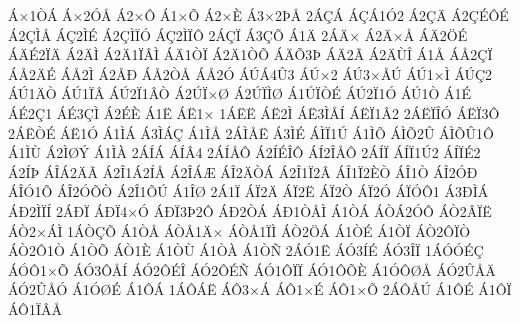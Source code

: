 {^^c1^^d71^^d2^^c1
^^c1^^d72^^d3^^c5
^^c12^^d7^^d4
^^c11^^d7^^d5
^^c12^^d7^^c8
^^c13^^d72^^de^^c5
2^^c1^^c7^^c1
^^c1^^c7^^c11^^d32
^^c12^^c7^^c4
^^c12^^c7^^c9^^d4^^c9
^^c12^^c7^^cc^^c5
^^c1^^c72^^cc^^c9
^^c12^^c7^^cc^^cf^^d3
^^c1^^c72^^cc^^cf^^d4
2^^c1^^c7^^cf
^^c13^^c7^^d5
^^c11^^c4
2^^c1^^c4^^d7
^^c12^^c4^^d7^^c5
^^c1^^c42^^d6^^c9
^^c1^^c4^^c92^^cf^^c4
^^c12^^c4^^cc
^^c12^^c41^^cf^^c2^^cc
^^c1^^c41^^d2^^cf
^^c12^^c41^^d2^^d5
^^c1^^c4^^d53^^de
^^c1^^c42^^c3
^^c12^^c4^^d9^^ce
^^c11^^c5
^^c1^^c52^^c7^^cf
^^c1^^c52^^c4^^c9
^^c1^^c52^^cc
^^c12^^c5^^d0
^^c1^^c52^^d2^^c5
^^c1^^c52^^d3
^^c1^^da^^c14^^db3
^^c1^^da^^d72
^^c1^^da3^^d7^^c5^^da
^^c1^^da1^^d7^^cc
^^c1^^da^^c72
^^c1^^da1^^c4^^d2
^^c1^^da1^^cf^^c2
^^c1^^da2^^cf1^^c2^^d2
^^c12^^da^^cf^^d7^^d8
^^c12^^da^^cf^^cc^^d8
^^c11^^da^^cf^^d2^^c9
^^c1^^da2^^cf1^^d3
^^c1^^da1^^d2
^^c11^^c9
^^c1^^c92^^c71
^^c1^^c93^^c7^^cc
^^c12^^c9^^c8
^^c11^^cb
^^c1^^cb1^^d7
1^^c1^^cb^^cb
^^c1^^cb2^^cc
^^c1^^cb3^^cc^^c5^^cd
^^c1^^cb^^cf1^^c22
2^^c1^^cb^^cf^^ce^^d3
^^c1^^cb^^cf3^^d4
2^^c1^^cb^^d2^^c9
^^c1^^cb1^^d3
^^c11^^cc^^c1
^^c13^^cc^^c1^^c7
^^c11^^cc^^c5
2^^c1^^cc^^c5^^cb
^^c13^^cc^^c9
^^c1^^cc^^cf1^^da
^^c11^^cc^^d5
^^c1^^cc^^d52^^db
^^c1^^cc^^d5^^db1^^d4
^^c11^^cc^^d9
^^c12^^cc^^d8^^dd
^^c11^^cc^^c0
2^^c1^^cd^^c1
^^c1^^cd^^c24
2^^c1^^cd^^c5^^d4
^^c12^^cd^^c9^^ce^^d4
^^c1^^cd2^^ce^^c5^^d4
2^^c1^^cd^^cf
^^c1^^cd^^cf1^^da2
^^c1^^cd^^cf^^c92
^^c12^^cd^^de
^^c1^^ce^^c12^^c4^^c3
^^c12^^ce1^^c12^^cd^^c5
^^c12^^ce^^c1^^c6
^^c1^^ce2^^c4^^d2^^c1
^^c12^^ce1^^cf2^^c2
^^c1^^ce1^^cf2^^c8^^d2
^^c1^^ce1^^d2
^^c1^^ce2^^d3^^d0
^^c1^^ce^^d31^^d5
^^c1^^ce2^^d3^^d5^^d2
^^c12^^ce1^^d5^^da
^^c11^^ce^^d8
2^^c11^^cf
^^c1^^cf2^^c4
^^c1^^cf2^^cb
^^c1^^cf2^^d2
^^c1^^cf2^^d3
^^c1^^cf^^d3^^d41
^^c13^^d0^^cc^^c1
^^c1^^d02^^cc^^cf^^cd
2^^c1^^d0^^cf
^^c1^^d0^^cf4^^d7^^d3
^^c1^^d0^^cf3^^de2^^d4
^^c1^^d02^^d2^^c1
^^c1^^d01^^d2^^c5^^cc
^^c11^^d2^^c1
^^c1^^d2^^c12^^d3^^d4
^^c1^^d22^^c2^^cf^^cb
^^c1^^d22^^d7^^c1^^cc
1^^c1^^d2^^c7^^d5
^^c11^^d2^^c5
^^c1^^d2^^c51^^c4^^d7
^^c1^^d2^^c51^^cf^^cc
^^c1^^d22^^d6^^c1
^^c11^^d2^^c9
^^c11^^d2^^cf
^^c1^^d22^^d4^^cf^^d2
^^c1^^d22^^d41^^d2
^^c11^^d2^^d5
^^c1^^d21^^c8
^^c11^^d2^^d9
^^c11^^d2^^c0
^^c11^^d2^^d1
2^^c1^^d31^^cb
^^c1^^d33^^cd^^c9
^^c1^^d33^^ce^^cf
1^^c1^^d3^^d3^^c9^^c7
^^c1^^d3^^d41^^d7^^d5
^^c1^^d33^^d4^^c5^^cd
^^c1^^d32^^d4^^c9^^ce
^^c1^^d32^^d4^^c9^^d1
^^c1^^d31^^d4^^cf^^cf
^^c1^^d31^^d4^^d5^^c8
^^c11^^d3^^d4^^d8^^c5
^^c1^^d32^^db^^c5^^c4
^^c1^^d32^^db^^c5^^d3
^^c11^^d3^^d8^^c9
^^c11^^d4^^c1
1^^c1^^d4^^c1^^cb
^^c1^^d43^^d7^^c1
^^c1^^d41^^d7^^c9
^^c1^^d41^^d7^^d5
2^^c1^^d4^^c5^^da
^^c11^^d4^^c9
^^c11^^d4^^cf
^^c1^^d41^^cf^^c2^^c5
}
